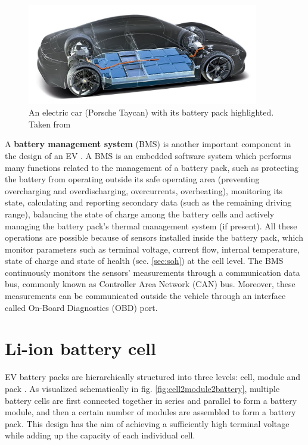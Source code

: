 \begin{figure}[hbt!]
    \centering
    \includegraphics[width=0.9\textwidth]{images/porsche_taycan}
    \caption[An electric car and its battery pack]{An electric car (Porsche Taycan) with its battery pack highlighted. Taken from \cite{porsche_taycan}}
    \label{fig:porsche_taycan}
\end{figure}

A \textbf{battery management system} (BMS) is another important component in the design of an EV \cite{bms}. A BMS is an embedded software system which performs many functions related to the management of a battery pack, such as protecting the battery from operating outside its safe operating area (preventing overcharging and overdischarging, overcurrents, overheating), monitoring its state, calculating and reporting secondary data (such as the remaining driving range), balancing the state of charge among the battery cells and actively managing the battery pack's thermal management system (if present). All these operations are possible because of sensors installed inside the battery pack, which monitor parameters such as terminal voltage, current flow, internal temperature, state of charge and state of health (sec. \ref{sec:soh}) at the cell level. The BMS continuously monitors the sensors' measurements through a communication data bus, commonly known as Controller Area Network (CAN) bus. Moreover, these measurements can be communicated outside the vehicle through an interface called On-Board Diagnostics (OBD) port.

\section{Li-ion battery cell}
\label{sec:li-ion}
EV battery packs are hierarchically structured into three levels: cell, module
and pack \cite{li-ion_battery_properties}.
As visualized schematically in fig. \ref{fig:cell2module2battery}, multiple battery cells are first connected together in series and parallel to form a battery module, and then a certain number of modules are assembled to form a battery pack. This design has the aim of achieving a sufficiently high terminal voltage while adding up the capacity of each individual cell.


